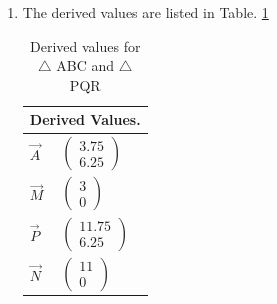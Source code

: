 \begin{enumerate}[label=\thesection.\arabic*.,ref=\thesection.\theenumi]
\item The derived values are listed in  
Table. \ref{table:table2} 
\begin{table}[ht!]
\centering
\begin{tabular}{ |p{2cm}|p{3cm}|  }
\hline
 \multicolumn{2}{|c|}{Derived Values.} \\
\hline \centering
$\vec{A}$ & $\begin{pmatrix}3.75\\6.25\end{pmatrix}$\\
\hline \centering
$\vec{M}$ & $\begin{pmatrix}3\\0\end{pmatrix}$\\
\hline \centering
$\vec{P}$ & $\begin{pmatrix}11.75\\6.25\end{pmatrix}$\\
\hline \centering
$\vec{N}$ & $\begin{pmatrix}11\\0\end{pmatrix}$\\
\hline 

\end{tabular}
\caption{Derived values for $\triangle $ ABC and $\triangle$ PQR}
\label{table:table2}
\end{table}


\end{enumerate}

